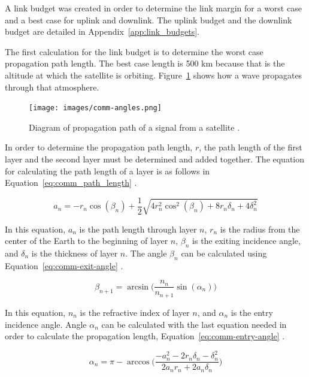 \documentclass[12pt]{article}
\begin{document}
A link budget was created in order to determine the link margin for a worst case and a best case for uplink and downlink. The uplink budget and the downlink budget are detailed in Appendix~\ref{app:link_budgets}.

The first calculation for the link budget is to determine the worst case propagation path length. The best case length is 500 km because that is the altitude at which the satellite is orbiting. Figure~\ref{fig:comm_propagation_path} shows how a wave propagates through that atmosphere.

\begin{figure}[ht]
\centering
  \texttt{[image: images/comm-angles.png]}
\caption{Diagram of propagation path of a signal from a satellite \cite[p.~12]{ITU-R}.}
\label{fig:comm_propagation_path}
\end{figure}

In order to determine the propagation path length, $r$, the path length of the first layer and the second layer must be determined and added together. The equation for calculating the path length of a layer is as follows in Equation~\ref{eq:comm_path_length} \cite[p.~9]{ITU-R}.

\begin{equation}\label{eq:comm_path_length}
a_n = -r_n\cos(\beta_n) + \frac{1}{2}\sqrt{4r_n^2\cos^2(\beta_n)+8r_n\delta_n+4\delta_n^2} 
\end{equation}

In this equation, $a_n$ is the path length through layer $n$, $r_n$ is the radius from the center of the Earth to the beginning of layer $n$, $\beta_n$ is the exiting incidence angle, and $\delta_n$ is the thickness of layer $n$.
The angle $\beta_n$ can be calculated using Equation~\ref{eq:comm-exit-angle} \cite[p.~10]{ITU-R}.

\begin{equation}\label{eq:comm-exit-angle}
\beta_{n+1} = \arcsin\biggl(\frac{n_n}{n_{n+1}}\sin(\alpha_n)\biggr) 
\end{equation}

In this equation, $n_n$ is the refractive index of layer $n$, and $\alpha_n$ is the entry incidence angle. Angle $\alpha_n$ can be calculated with the last equation needed in order to calculate the propagation length, Equation~\ref{eq:comm-entry-angle} \cite[p.~9]{ITU-R}.

\begin{equation}\label{eq:comm-entry-angle}
\alpha_n = \pi - \arccos \biggl(\frac{-a_n^2 - 2r_n\delta_n - \delta_n^2}{2a_n r_n + 2a_n \delta_n}\biggr) 
\end{equation}
\end{document}
